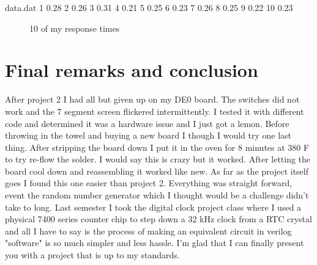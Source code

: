 \documentclass[paper=a4, fontsize=11pt]{scrartcl}
\numberwithin{equation}{section}		%
\numberwithin{figure}{section}			%
\numberwithin{table}{section}				%
\begin{document}
\begin{center}
\pgfplotsset{compat=1.10}
\newcommand{\plots}{0.611201}
\newcommand{\plotm}{2.19882}
\begin{filecontents}{data.dat}
1 0.28
2 0.26
3 0.31
4 0.21
5 0.25
6 0.23
7 0.26
8 0.25
9 0.22
10 0.23

\end{filecontents}
\begin{figure}[h!]
\centering
\caption{10 of my response times}

\label{fig:histm}
\end{figure}




\section{Final remarks and conclusion}

After project 2 I had all but given up on my DE0 board. The switches did not work and the 7 segment screen flickered intermittently. I tested it with different code and determined it was a hardware issue and I just got a lemon. Before throwing in the towel and buying a new board I though I would try one last thing. After stripping the board down I put it in the oven for 8 minutes at 380 F to try re-flow the solder. I would say this is crazy but it worked. After letting the board cool down and reassembling it worked like new. As far as the project itself goes I found this one easier than project 2. Everything was straight forward, event the random number generator which I thought would be a challenge didn't take to long. Last semester I took the digital clock project class where I used a physical 7400 series counter chip to step down a 32 kHz clock from a RTC crystal and all I have to say is the process of making an equivalent circuit in verilog "software" is so much simpler and less hassle. I'm glad that I can finally present you with a project that is up to my standards.

\end{center}
\end{document}
